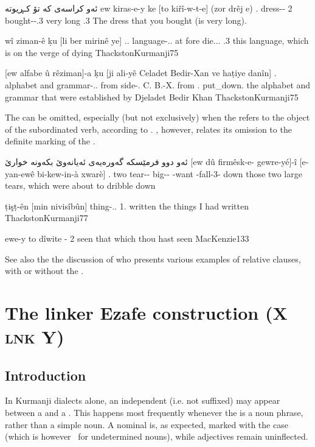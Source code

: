 {ئەو كراسەی كە تۆ كـڕیوتە}
{ew kiras-e-y ke [to kiřî-w-t-e] (zor drêj \cb{}e)}
{\dem.\far{} dress--\ez{} \rel{} 2\sg{} bought-\sg-\cop.3\sg{} very long \cb{}\cop.3\sg}
{The dress that you bought (is very long).}
{\citep[156]{BlauSorani}}

{wî ziman-ê ḳu [li ber mirinê ye]}
{\dem.\far.\obl{} language-\ez..\masc{} \rel{} at fore die.\inf.\obl.\fem{} \cop.3\sg}
{this language, which is on the verge of dying}
{ThackstonKurmanji}{75}

{[ew alfabe û rêziman]-a ḳu [ji ali-yê Celadet Bedir-Xan ve haṭiye danîn]}
{\dem.\far{} alphabet and grammar-\ez..\fem{} \rel{} from side-\ez.\masc{} C. B.-X. from \pass.\prf{} put\_down.\inf}
{the alphabet and grammar that were established by Djeladet Bedir Khan}
{ThackstonKurmanji}{75}\antipar\antipar 
\newpage 

The \rel* can be omitted, especially (but not exclusively) when the \prim refers to the object of the subordinated verb, according to  \textcites[73]{ThackstonSorani}[77]{ThackstonKurmanji}. \citet[157]{BlauSorani}, however, relates its omission to the definite marking of the \prim.


{ئەو دوو فرمێسكە گەورەیەی ئەیانەوێ  بكەونە خوارێ}
{[ew dû firmêsk-e- gewre-yé]-î [e-yan-ewê bi-kew-in-à xwarè]}
{\dem.\far{} two tear-\ez- big--\ez{} \pl-want \subj-fall-3\pl{}-\dir{} down}
{those two large tears, which were about to dribble down}
{\citep[75]{ThackstonSorani}}

{ṭişṭ-ên [min nivisîbûn]}
{thing-\ez..\pl{} 1\sg.\obl{} written}
{the things I had written}
{ThackstonKurmanji}{77}

{ewe-y to dîwite}
{\dem-\ez{} 2\sg{} seen}
{that which thou hast seen}
{MacKenzie}{133}

See also the the discussion of \citet[203--204]{MacKenzie} who presents various examples of \Kur relative clauses, with or without the \rel*.


\section{The linker Ezafe construction (X \textsc{lnk} Y)} \label{ss:lnk_ez}
\subsection{Introduction}
In Kurmanji dialects alone, an independent (i.e. not suffixed) \ez* may appear between a \prim and a \secn.
This happens most frequently whenever the \prim is a noun phrase, rather than a simple noun. A nominal \secn is, as expected, marked with the \obl* case (which is however \zero\ for undetermined \masc* \sg* nouns), while adjectives  remain  uninflected.

